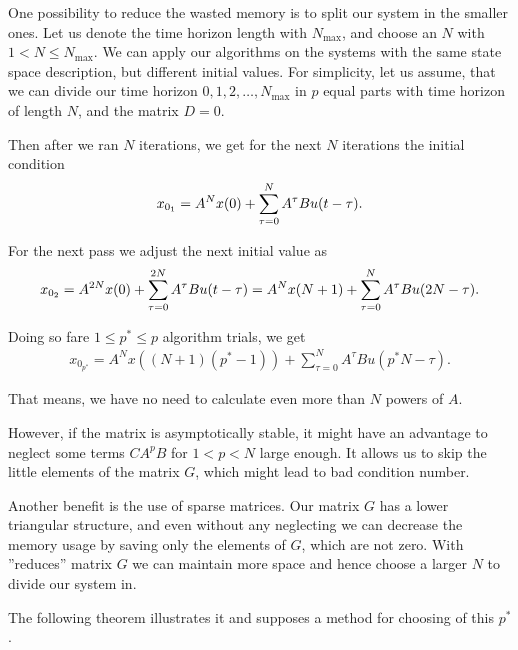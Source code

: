 	One possibility to reduce the wasted memory is to split our system in the smaller ones. Let us denote the time horizon length with $N_{\max}$, and choose an $N$ with $1<N\leq N_{\max}$. 
	We can apply our algorithms on the systems with the same state space description, but different initial values. For simplicity, let us assume, that we can divide our time horizon $0,1,2,\dots, N_{\max}$ in $p$ equal parts with time horizon of length $N$, and the matrix $D = 0$. 
	
	Then after we ran $N$ iterations, we get for the next $N$ iterations the initial condition
	\begin{align}
	x_{0_{\rm{1}}} = A^{N} x(0) + \sum_{\tau = 0}^N A^{\tau}B u(t - \tau). 
	\end{align}
	
	For the next pass we adjust the next initial value as 
	\begin{align}
	x_{0_{\rm{2}}} = A^{2N} x(0) + \sum_{\tau = 0}^{2N} A^{\tau}B u(t - \tau) = A^N x(N+1) + \sum_{\tau = 0}^N A^{\tau} B u(2N - \tau). 
	\end{align}
	
	Doing so fare $1 \leq p^* \leq p$ algorithm trials, we get 
	\begin{align}
	x_{0_{p^*}} = A^N x((N+1)(p^* - 1)) + \sum_{\tau = 0}^N A^{\tau}B u(p^*N - \tau). 
	\end{align}
	
	That means, we have no need to calculate even more than $N$ powers of $A$. 
	
	However, if the matrix is asymptotically stable, it might have an advantage to neglect some terms $C A^p B$ for $1<p<N$ large enough. 
	It allows us to skip the little elements of the matrix $G$, which might lead to bad condition number. 

	Another benefit is the use of sparse matrices. 	
	Our matrix $G$ has a lower triangular structure, and even without any neglecting we can decrease the memory usage by saving only the elements of $G$, which are not zero. With ''reduces'' matrix $G$ we can maintain more space and hence choose a larger $N$ to divide our system in.
	
	The following theorem illustrates it and supposes a method for choosing of this $p^*$. 
	
